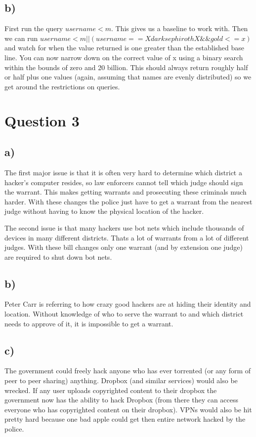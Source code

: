 \documentclass{article}
\begin{document}
\subsection*{b)}
\label{sub:b_}
First run the query $username < m$. This gives us a baseline to work with. Then we can run $username < m || (username == XdarksephirothX \&\& gold <= x)$ and watch for when the value returned is one greater than the established base line. You can now narrow down on the correct value of x using a binary search within the bounds of zero and 20 billion.  This should always return roughly half or half plus one values (again, assuming that names are evenly distributed) so we get around the restrictions on queries. 

\section*{Question 3}
\label{sec:question_3}
\subsection*{a)}
\label{sub:a_}
The first major issue is that it is often very hard to determine which district a hacker's computer resides, so law enforcers cannot tell which judge should sign the warrant. This makes getting warrants and prosecuting these criminals much harder. With these changes the police just have to get a warrant from the nearest judge without having to know the physical location of the hacker. 

The second issue is that many hackers use bot nets which include thousands of devices in many different districts. Thats a lot of warrants from a lot of different judges. With these bill changes only one warrant (and by extension one judge) are required to shut down bot nets.
\subsection*{b)}
\label{sub:b_}
Peter Carr is referring to how crazy good hackers are at hiding their identity and location. Without knowledge of who to serve the warrant to and which district needs to approve of it, it is impossible to get a warrant. 
\subsection*{c)}
\label{sub:c_}
The government could freely hack anyone who has ever torrented (or any form of peer to peer sharing) anything. Dropbox (and similar services) would also be wrecked. If any user uploads copyrighted content to their dropbox the government now has the ability to hack Dropbox (from there they can access everyone who has copyrighted content on their dropbox). VPNs would also be hit pretty hard because one bad apple could get then entire network hacked by the police.
\end{document}
